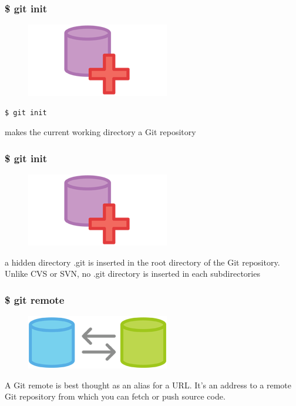 \documentclass{beamer}
\begin{document}
\begin{frame}[fragile]
    \frametitle{\$ git init}
    \begin{figure}[h!]
        \begin{center}
            \includegraphics[scale=0.7]{init.png}
        \end{center}
    \end{figure}
    \begin{verbatim}
$ git init
    \end{verbatim}
    makes the current working directory a Git repository
\end{frame}

\begin{frame}
    \frametitle{\$ git init}
    \begin{figure}[h!]
        \begin{center}
            \includegraphics[scale=0.7]{init.png}
        \end{center}
    \end{figure}
    a hidden directory .git is inserted in the root directory
    of the Git repository. Unlike CVS or SVN, no .git directory
    is inserted in each subdirectories
\end{frame}

\begin{frame}
    \frametitle{\$ git remote}
    \begin{figure}[h!]
        \begin{center}
            \includegraphics[scale=0.7]{remote.png}
        \end{center}
    \end{figure}
    A Git remote is best thought as an alias for a URL.
    It's an address to a remote Git repository from
    which you can fetch or push source code.
\end{frame}
\end{document}
